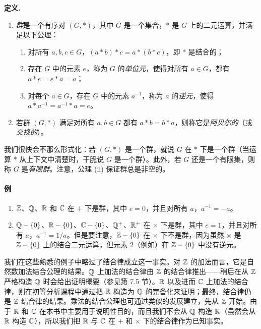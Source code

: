 \noindent\textbf{定义.}
\begin{enumerate}[label=(\arabic*)]
  \item \emph{群}是一个有序对 $(G,*)$，其中 $G$ 是一个集合，$*$ 是 $G$ 上的二元运算，并满足以下公理：
  \begin{enumerate}[label=(\roman*)]
    \item 对所有 $a,b,c\in G$，$(a*b)*c=a*(b*c)$，即 $*$ 是结合的；
    \item 存在 $G$ 中的元素 $e$，称为 $G$ 的\emph{单位元}，使得对所有 $a\in G$，都有 $a*e=e*a=a$；
    \item 对每个 $a\in G$，存在 $G$ 中的元素 $a^{-1}$，称为 $a$ 的\emph{逆元}，使得 $a*a^{-1}=a^{-1}*a=e$。
  \end{enumerate}
  \item 若群 $(G,*)$ 满足对所有 $a,b\in G$ 都有 $a*b=b*a$，则称它是\emph{阿贝尔的}（或\emph{交换的}）。
\end{enumerate}

我们很快会不那么形式化：若 $(G,*)$ 是一个群，就说 $G$ 在 $*$ 下是一个群（当运算 $*$ 从上下文中清楚时，干脆说 $G$ 是一个群）。此外，若 $G$ 还是一个有限集，则称 $G$ 是\emph{有限群}。注意，公理 (ii) 保证群总是非空的。

\paragraph{例}
\begin{enumerate}[label=(\arabic*)]
  \item $\mathbb{Z}$、$\mathbb{Q}$、$\mathbb{R}$ 和 $\mathbb{C}$ 在 $+$ 下是群，其中 $e=0$，并且对所有 $a$，$a^{-1}=-a$。
  \item $\mathbb{Q}-\{0\}$、$\mathbb{R}-\{0\}$、$\mathbb{C}-\{0\}$、$\mathbb{Q}^+$、$\mathbb{R}^+$ 在 $\times$ 下是群，其中 $e=1$，并且对所有 $a$，$a^{-1}=1/a$。但是要注意，$\mathbb{Z}-\{0\}$ 在 $\times$ 下不是群，因为虽然 $\times$ 是 $\mathbb{Z}-\{0\}$ 上的结合二元运算，但元素 $2$（例如）在 $\mathbb{Z}-\{0\}$ 中没有逆元。
\end{enumerate}

我们在这些熟悉的例子中略过了结合律成立这一事实。对 $\mathbb{Z}$ 的加法而言，它是自然数加法结合公理的结果。$\mathbb{Q}$ 上加法的结合律由 $\mathbb{Z}$ 的结合律推出——稍后在从 $\mathbb{Z}$ 严格构造 $\mathbb{Q}$ 时会给出证明概要（参见第 7.5 节）。$\mathbb{R}$ 以及进而 $\mathbb{C}$ 上加法的结合律，则在初等分析课程中通过把 $\mathbb{R}$ 构造为 $\mathbb{Q}$ 的完备化来证明；最终，结合律仍是 $\mathbb{Z}$ 结合律的结果。乘法的结合公理也可通过类似的发展建立，先从 $\mathbb{Z}$ 开始。由于 $\mathbb{R}$ 和 $\mathbb{C}$ 在本书中主要用于说明性目的，而且我们不会从 $\mathbb{Q}$ 构造 $\mathbb{R}$（虽然会从 $\mathbb{R}$ 构造 $\mathbb{C}$），所以我们把 $\mathbb{R}$ 与 $\mathbb{C}$ 在 $+$ 和 $\times$ 下的结合律作为已知事实。

